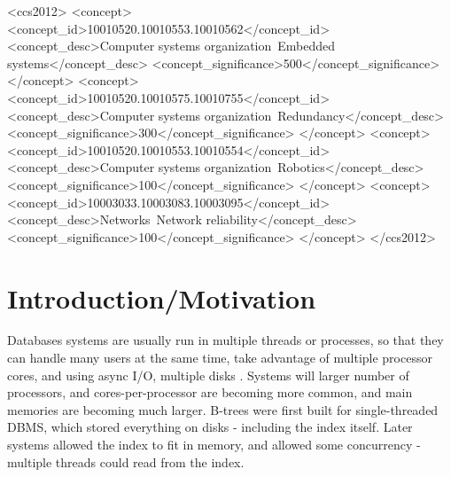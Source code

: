 \documentclass{sig-alternate}
\begin{document}
%
%
\begin{CCSXML}
<ccs2012>
 <concept>
  <concept_id>10010520.10010553.10010562</concept_id>
  <concept_desc>Computer systems organization~Embedded systems</concept_desc>
  <concept_significance>500</concept_significance>
 </concept>
 <concept>
  <concept_id>10010520.10010575.10010755</concept_id>
  <concept_desc>Computer systems organization~Redundancy</concept_desc>
  <concept_significance>300</concept_significance>
 </concept>
 <concept>
  <concept_id>10010520.10010553.10010554</concept_id>
  <concept_desc>Computer systems organization~Robotics</concept_desc>
  <concept_significance>100</concept_significance>
 </concept>
 <concept>
  <concept_id>10003033.10003083.10003095</concept_id>
  <concept_desc>Networks~Network reliability</concept_desc>
  <concept_significance>100</concept_significance>
 </concept>
</ccs2012>
\end{CCSXML}



%
%

%
%



\section{Introduction/Motivation}
Databases systems are usually run in multiple threads or processes, so that they can handle many users at the same time, take advantage of multiple processor cores, and using async I/O, multiple disks \cite{graefe:survey}.  Systems will larger number of processors, and cores-per-processor are becoming more common, and main memories are becoming much larger.  B-trees were first built for single-threaded DBMS, which stored everything on disks - including the index itself.  Later systems allowed the index to fit in memory, and allowed some concurrency - multiple threads could read from the index.
\end{document}
